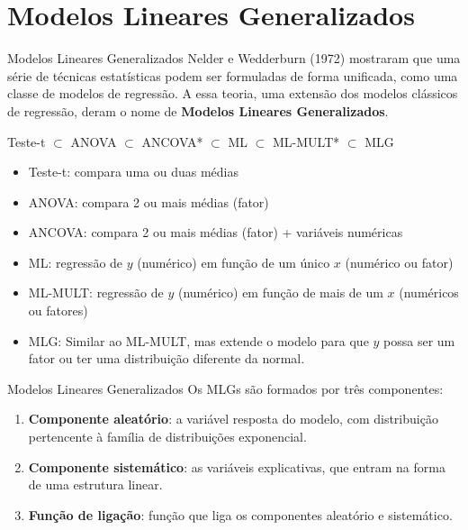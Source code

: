 \documentclass[10pt]{beamer}\usepackage[]{graphicx}\usepackage[]{color}
\begin{document}
\section[MLGs]{Modelos Lineares Generalizados}

\begin{frame}[fragile=singleslide]{Modelos Lineares Generalizados}
Nelder e Wedderburn (1972) mostraram que uma série de técnicas
estatísticas podem ser formuladas de forma unificada, como uma classe de
modelos de regressão. A essa teoria, uma extensão dos modelos clássicos
de regressão, deram o nome de \textbf{Modelos Lineares
  Generalizados}.
\begin{center}
  Teste-t $\subset$ ANOVA $\subset$ ANCOVA* $\subset$ ML $\subset$
  ML-MULT* $\subset$ MLG
\end{center}
  \begin{itemize}
  \item Teste-t: compara uma ou duas médias
  \item ANOVA: compara 2 ou mais médias (fator)
  \item ANCOVA: compara 2 ou mais médias (fator) + variáveis numéricas
  \item ML: regressão de $y$ (numérico) em função de um único $x$
    (numérico ou fator)
  \item ML-MULT: regressão de $y$ (numérico) em função de mais de um $x$
    (numéricos ou fatores)
  \item MLG: Similar ao ML-MULT, mas extende o modelo para que $y$ possa
    ser um fator ou ter uma distribuição diferente da normal.
  \end{itemize}
\end{frame}

\begin{frame}[fragile=singleslide]{Modelos Lineares Generalizados}
Os MLGs são formados por três componentes:
\begin{enumerate}
\item \textbf{Componente aleatório}: a variável resposta do modelo, com
  distribuição pertencente à família de distribuições exponencial.
\item \textbf{Componente sistemático}: as variáveis explicativas, que
  entram na forma de uma estrutura linear.
\item \textbf{Função de ligação}: função que liga os componentes
  aleatório e sistemático.
\end{enumerate}
\end{frame}
\end{document}
